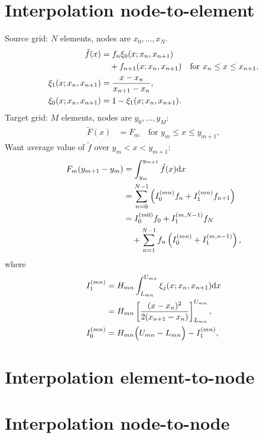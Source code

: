 \documentclass[a4paper,10pt]{article}
\def\rmd{{\rm d}}
\begin{document}
\section{Interpolation node-to-element}
Source grid: $N$ elements, nodes are $x_0,\ldots,x_N$.
\begin{subequations}
\begin{align}
\tilde f(x)&=f_n\xi_0(x;x_n,x_{n+1})\notag\\
&\quad+f_{n+1}(x;x_n,x_{n+1})\quad\text{for $x_n\leq x\leq x_{n+1}$},\\
\xi_1(x;x_n,x_{n+1})&=\frac{x-x_n}{x_{n+1}-x_n},\\
\xi_0(x;x_n,x_{n+1})&=1-\xi_1(x;x_n,x_{n+1}).
\end{align}
\end{subequations}
Target grid: $M$ elements, nodes are $y_0,\ldots,y_M$:
\begin{align}
\tilde F(x)&=F_m\quad\text{for $y_m\leq x\leq y_{m+1}$},
\end{align}
Want average value of $\tilde f$ over $y_m<x<y_{m+1}$:
\begin{align}
F_m(y_{m+1}-y_m)
&=\int_{y_m}^{y_{m+1}}\tilde f(x)\rmd x\notag\\
&=\sum_{n=0}^{N-1}
\left(I_0^{(mn)}f_n+I_1^{(mn)}f_{n+1}\right)\notag\\
&=I_0^{(m0)}f_0+I_1^{(m,N-1)}f_N\notag\\
&\quad+\sum_{n=1}^{N-1}f_n\left(I_0^{(mn)}+I_1^{(m,n-1)}\right)
,
\end{align}
where
\begin{subequations}
\begin{align}
I_1^{(mn)}&=H_{mn}\int_{L_{mn}}^{U_{mn}}\xi_j(x;x_n,x_{n+1})\rmd x\notag\\
&=H_{mn}\left[\frac{(x-x_n)^2}{2(x_{n+1}-x_n)}\right]^{U_{mn}}_{L_{mn}},\\
I_0^{(mn)}&=H_{mn}\Big(U_{mn}-L_{mn}\Big)-I_1^{(mn)},
\end{align}
\end{subequations}

\section{Interpolation element-to-node}
\section{Interpolation node-to-node}



\end{document}
